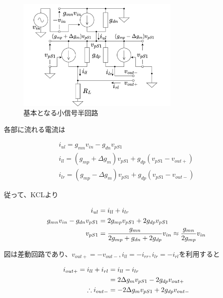 \documentclass[twocolumn]{jsarticle}
\begin{document}
    \begin{figure}[h]
        \begin{center}
            \includegraphics*[width=80mm]{figures/FoldedGilbertHalfBaseEquivalentCircuit.png}
            \caption{基本となる小信号半回路}
            \label{fig:eq_base}
        \end{center}
    \end{figure}

    各部に流れる電流は

    \begin{align*}
        i_{ul}=g_{mn}v_{in}-g_{dn}v_{pS1}   \\
        i_{ll}=(g_{mp}+\Delta g_{m})v_{pS1}+g_{dp}(v_{pS1}-v_{out+})    \\
        i_{lr}=(g_{mp}-\Delta g_{m})v_{pS1}+g_{dp}(v_{pS1}-v_{out-})
    \end{align*}

    従って、KCLより

    \begin{align}
        i_{ul} &= i_{ll}+i_{lr}   \notag\\
        g_{mn}v_{in}-g_{dn}v_{pS1} &= 2g_{mp}v_{pS1}+2g_{dp}v_{pS1}     \notag\\
        v_{pS1} &= \frac{g_{mn}}{2g_{mp}+g_{dn}+2g_{dp}}v_{in}\approx\frac{g_{mn}}{2g_{mp}}v_{in}   \\
    \end{align}

    図は差動回路であり、$v_{out+}=-v_{out-},i_{ll}=-i_{rr},i_{lr}=-i_{rl}$を利用すると

    \begin{align}
        i_{out+}=i_{ll}+i_{rl}&=i_{ll}-i_{lr}   \notag\\
        &= 2\Delta g_{m}v_{pS1}-2g_{dp}v_{out+}     \label{eq:ioutp}\\
        \therefore i_{out-} &= -2\Delta g_{m}v_{pS1}+2g_{dp}v_{out-}    \label{eq:ioutm}
    \end{align}
\end{document}
